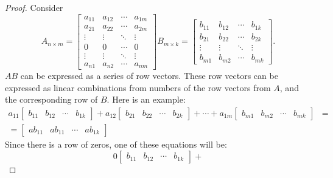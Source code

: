 \documentclass{article}
\begin{document}
\begin{enumerate}
{\begin{enumerate}
            \begin{proof}
                Consider
                \[
                    A_{n \times m} = \begin{bmatrix}
                        a_{11} & a_{12} & \cdots & a_{1m} \\
                        a_{21} & a_{22} & \cdots & a_{2m} \\
                        \vdots & \vdots & \ddots & \vdots \\
                        0      & 0      & \cdots & 0      \\
                        \vdots & \vdots & \ddots & \vdots \\
                        a_{n1} & a_{n2} & \cdots & a_{nm}
                    \end{bmatrix}
                    B_{m \times k} = \begin{bmatrix}
                        b_{11} & b_{12} & \cdots & b_{1k} \\
                        b_{21} & b_{22} & \cdots & b_{2k} \\
                        \vdots & \vdots & \ddots & \vdots \\
                        b_{m1} & b_{m2} & \cdots & b_{mk}
                    \end{bmatrix}.
                \]
                $AB$ can be expressed as a series of row vectors. These row vectors can be expressed as linear combinations from numbers of the row vectors from $A$, and the corresponding row of $B$. Here is an example:
                \begin{align}
                    a_{11}\begin{bmatrix} b_{11} & b_{12} & \cdots & b_{1k}\end{bmatrix} +
                    a_{12}\begin{bmatrix} b_{21} & b_{22} & \cdots & b_{2k}\end{bmatrix} + \cdots +
                    a_{1m}\begin{bmatrix} b_{m1} & b_{m2} & \cdots & b_{mk}\end{bmatrix} & = \\
                    = \begin{bmatrix}ab_{11} & ab_{11} & \cdots & ab_{1k} \end{bmatrix}  &
                \end{align}
                Since there is a row of zeros, one of these equations will be:
                \[
                    0\begin{bmatrix} b_{11} & b_{12} & \cdots & b_{1k}\end{bmatrix} +
\]
\end{proof}
\end{enumerate}}
\end{enumerate}
\end{document}
